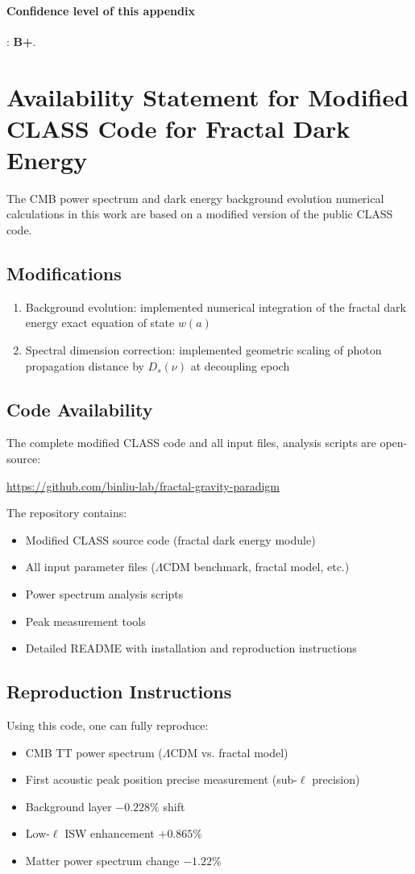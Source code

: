 \documentclass[12pt,a4paper,twocolumn]{article}
\begin{document}
\paragraph{Confidence level of this appendix}: \textbf{B+}.

\section{Availability Statement for Modified CLASS Code for Fractal Dark Energy}
\label{app:class_code}

The CMB power spectrum and dark energy background evolution numerical calculations in this work are based on a modified version of the public CLASS code.

\subsection{Modifications}
\begin{enumerate}
\item Background evolution: implemented numerical integration of the fractal dark energy exact equation of state $w(a)$
\item Spectral dimension correction: implemented geometric scaling of photon propagation distance by $D_s(\nu)$ at decoupling epoch
\end{enumerate}

\subsection{Code Availability}
The complete modified CLASS code and all input files, analysis scripts are open-source:

\url{https://github.com/binliu-lab/fractal-gravity-paradigm}

The repository contains:
\begin{itemize}
\item Modified CLASS source code (fractal dark energy module)
\item All input parameter files ($\Lambda$CDM benchmark, fractal model, etc.)
\item Power spectrum analysis scripts
\item Peak measurement tools
\item Detailed README with installation and reproduction instructions
\end{itemize}

\subsection{Reproduction Instructions}
Using this code, one can fully reproduce:
\begin{itemize}
\item CMB TT power spectrum ($\Lambda$CDM vs. fractal model)
\item First acoustic peak position precise measurement (sub-$\ell$ precision)
\item Background layer $-0.228\%$ shift
\item Low-$\ell$ ISW enhancement $+0.865\%$
\item Matter power spectrum change $-1.22\%$
\end{itemize}
\end{document}
